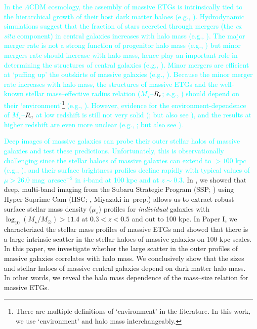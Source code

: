 \documentclass[a4paper,fleqn,usenatbib]{mnras}
\def\sb{mag~arcsec$^{-2}$}
\def\mstar{{$M_{\star}$}}
\def\logms{{$\log_{10} (M_{\star}/M_{\odot})$}}
\def\mden{{$\mu_{\star}$}}
\newcommand{\song}[1]{\textcolor{cyan}{#1}}
\begin{document}
    \song{In the $\Lambda$CDM cosmology, the assembly of massive ETGs is intrinsically 
    tied to the hierarchical growth of their host dark matter haloes 
    (e.g., \citealt{Leauthaud2012, Behroozi2013, Shankar2013}). 
    Hydrodynamic simulations suggest that the fraction of stars accreted through 
    mergers (the \textit{ex situ} component) in central galaxies increases with halo 
    mass (e.g., \citealt{RodriguezGomez2016, Pillepich2017b}). 
    The major merger rate is not a strong function of progenitor halo mass 
    (e.g., \citealt{Shankar2015}) but minor mergers rate should increase with 
    halo mass, hence play an important role in determining the structures of central 
    galaxies (e.g., \citealt{Guo2011, Yoon2017}). 
    Minor mergers are efficient at `puffing up' the outskirts of massive 
    galaxies (e.g., \citealt{Oogi2013, Bedorf2013}). 
    Because the minor merger rate increases with halo mass, the 
    structures of massive ETGs and the well-known stellar mass--effective radius 
    relation (\mstar{}--$R_{\rm e}$; e.g., \citealt{Shen2003, Guo2009}) should 
    depend on their `environment'\footnote{There are multiple definitions of 
    `environment' in the literature. 
    In this work, we use `environment' and halo mass interchangeably.}
    (e.g., \citealt{Shankar2013, Shankar2014}). 
    However, evidence for the environment-dependence of \mstar{}--$R_{\rm e}$
    at low redshift is still not very solid (\citealt{Nair2010, HCompany13}; 
    but also see \citealt{Yoon2017}), and the results at higher redshift are 
    even more unclear (e.g., \citealt{Papovich2012, Lani2013, Delaye2014}; but 
    also see \citealt{Rettura2010}).
    }
	
	\song{
    Deep images of massive galaxies can probe their outer stellar halos of massive 
    galaxies and test these predictions. 
    Unfortunately, this is observationally challenging since the stellar haloes 
    of massive galaxies can extend to $>100$ kpc (e.g., 
    \citealt{Tal2011, DSouza2014}), and their surface brightness profiles decline 
    rapidly with typical values of $\mu > 26.0$ \sb{} in $i$-band at 100 kpc and 
    at $z\sim0.3$. 
    }
    In \citet[][Paper I hereafter]{hscMassiveI}, we showed that deep, 
    multi-band imaging from the Subaru Strategic Program (SSP; \citealt{HSC-SSP,
    HSC-DR1}) using Hyper Suprime-Cam (HSC; \citealt{Miyazaki2012}, 
    Miyazaki in~prep.) allows us to extract robust surface stellar
    mass density (\mden{}) profiles for {\it individual} galaxies with 
    \logms{}$>11.4$ at $0.3 < z < 0.5$ and out to 100 kpc. 
    In Paper I, we characterized the stellar mass profiles of massive ETGs and 
    showed that there is a large intrinsic scatter in the stellar haloes of
    massive galaxies on 100-kpc scales. 
    In this paper, we investigate whether the large scatter in the outer 
    profiles of massive galaxies correlates with halo mass. 
    We conclusively show that the sizes and stellar haloes of massive central 
    galaxies depend on dark matter halo mass. 
    In other words, we reveal the halo mass dependence of the mass--size relation 
    for massive ETGs.   
    
\end{document}
